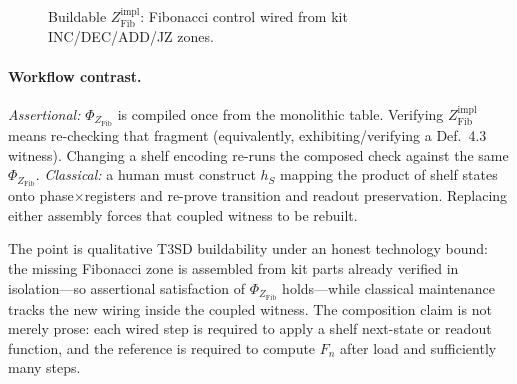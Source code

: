 \begin{figure}[!ht]
  \centering
  \caption{Buildable $Z_{\mathrm{Fib}}^{\mathrm{impl}}$: Fibonacci control wired from kit INC/DEC/ADD/JZ zones.}
  \label{fig:fib-impl}
\end{figure}

\paragraph{Workflow contrast.}
\textit{Assertional:} $\Phi_{Z_{\mathrm{Fib}}}$ is compiled once from the monolithic table. Verifying $Z_{\mathrm{Fib}}^{\mathrm{impl}}$ means re-checking that fragment (equivalently, exhibiting/verifying a Def.~4.3 witness). Changing a shelf encoding re-runs the composed check against the same $\Phi_{Z_{\mathrm{Fib}}}$.
\textit{Classical:} a human must construct $h_S$ mapping the product of shelf states onto phase$\times$registers and re-prove transition and readout preservation. Replacing either assembly forces that coupled witness to be rebuilt.

The point is qualitative T3SD buildability under an honest technology bound: the missing Fibonacci zone is assembled from kit parts already verified in isolation---so assertional satisfaction of $\Phi_{Z_{\mathrm{Fib}}}$ holds---while classical maintenance tracks the new wiring inside the coupled witness. The composition claim is not merely prose: each wired step is required to apply a shelf next-state or readout function, and the reference is required to compute $F_n$ after load and sufficiently many steps.
